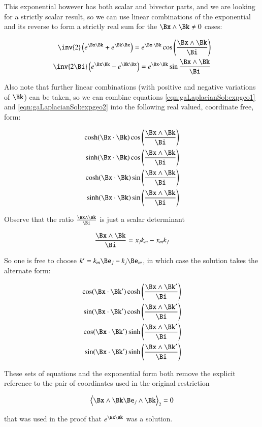 This exponential however has both scalar and bivector parts, and we are looking for a strictly scalar result, so we can use linear combinations of the
exponential and its reverse to form a strictly real sum for the $\Bx \wedge \Bk \ne 0$ cases:

\begin{align*}
\inv{2}\left(e^{\Bx\Bk} + e^{\Bk\Bx}\right) = e^{\Bx\cdot\Bk}\cos\left(\frac{\Bx \wedge \Bk}{\Bi}\right) \\
\inv{2\Bi}\left(e^{\Bx\Bk} - e^{\Bk\Bx}\right) = e^{\Bx\cdot\Bk}\sin{\frac{\Bx \wedge \Bk}{\Bi}} \\
\end{align*}

Also note that further linear combinations (with positive and negative variations of $\Bk$) can be taken, so we can
combine equations \ref{eqn:gaLaplacianSol:expgeo1} and \ref{eqn:gaLaplacianSol:expgeo2} into the following real valued, coordinate free, form:

\begin{align}
\cosh(\Bx\cdot\Bk)\cos\left({\frac{\Bx \wedge \Bk}{\Bi}}\right) \\
\sinh(\Bx\cdot\Bk)\cos\left({\frac{\Bx \wedge \Bk}{\Bi}}\right) \\
\cosh(\Bx\cdot\Bk)\sin\left({\frac{\Bx \wedge \Bk}{\Bi}}\right) \\
\sinh(\Bx\cdot\Bk)\sin\left({\frac{\Bx \wedge \Bk}{\Bi}}\right) 
\end{align}

Observe that the ratio $\frac{\Bx \wedge \Bk}{\Bi}$ is just a scalar 
determinant

\[
\frac{\Bx \wedge \Bk}{\Bi}
=
x_j k_m - x_m k_j
\]

So one is free to choose $k' = k_m \Be_j - k_j \Be_m$, in which case the
solution takes the alternate form:

\begin{align}
\cos(\Bx\cdot\Bk')\cosh\left({\frac{\Bx \wedge \Bk'}{\Bi}}\right) \\
\sin(\Bx\cdot\Bk')\cosh\left({\frac{\Bx \wedge \Bk'}{\Bi}}\right) \\
\cos(\Bx\cdot\Bk')\sinh\left({\frac{\Bx \wedge \Bk'}{\Bi}}\right) \\
\sin(\Bx\cdot\Bk')\sinh\left({\frac{\Bx \wedge \Bk'}{\Bi}}\right) 
\end{align}

These sets of equations and the exponential form both remove the explicit reference to the pair of coordinates used in the original restriction 

\[
\gpgradetwo{ \Bx \wedge \Bk \Be_j \wedge \Bk } = 0
\]

that was used in the proof that $e^{\Bx\Bk}$ was a solution.
